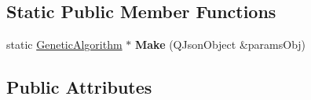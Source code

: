 \subsection*{Static Public Member Functions}
\begin{DoxyCompactItemize}
\item 
static \hyperlink{class_genetic_algorithm}{Genetic\+Algorithm} $\ast$ {\bfseries Make} (Q\+Json\+Object \&params\+Obj)\hypertarget{class_genetic_algorithm_a58957ce0d547dc7c634a6048ce7a33bb}{}\label{class_genetic_algorithm_a58957ce0d547dc7c634a6048ce7a33bb}

\end{DoxyCompactItemize}
\subsection*{Public Attributes}
